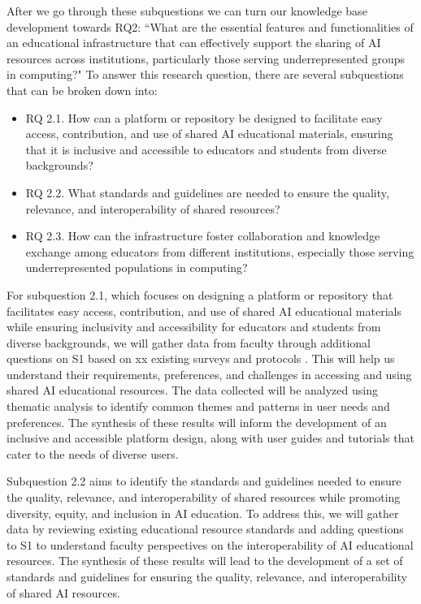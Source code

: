 \documentclass[11pt]{article}
\begin{document}
After we go through these subquestions we can turn our knowledge base development towards RQ2: ``What are the essential features and functionalities of an educational infrastructure that can effectively support the sharing of AI resources across institutions, particularly those serving underrepresented groups in computing?"  To answer this research question, there are several subquestions that can be broken down into:
\begin{itemize}

\item[]RQ 2.1. How can a platform or repository be designed to facilitate easy access, contribution, and use of shared AI educational materials, ensuring that it is inclusive and accessible to educators and students from diverse backgrounds?
\item[]RQ 2.2. What standards and guidelines are needed to ensure the quality, relevance, and interoperability of shared resources?
\item[]RQ 2.3. How can the infrastructure foster collaboration and knowledge exchange among educators from different institutions, especially those serving underrepresented populations in computing?
\end{itemize}

For subquestion 2.1, which focuses on designing a platform or repository that facilitates easy access, contribution, and use of shared AI educational materials while ensuring inclusivity and accessibility for educators and students from diverse backgrounds, we will gather data from faculty through additional questions on S1 based on xx existing surveys and protocols \cite{xxx}.
This will help us understand their requirements, preferences, and challenges in accessing and using shared AI educational resources. 
The data collected will be analyzed using thematic analysis to identify common themes and patterns in user needs and preferences.  
The synthesis of these results will inform the development of an inclusive and accessible platform design, along with user guides and tutorials that cater to the needs of diverse users. 

Subquestion 2.2 aims to identify the standards and guidelines needed to ensure the quality, relevance, and interoperability of shared resources while promoting diversity, equity, and inclusion in AI education. To address this, we will gather data by reviewing existing educational resource standards and adding questions to S1 to understand faculty perspectives on the interoperability of AI educational resources. 
The synthesis of these results will lead to the development of a set of standards and guidelines for ensuring the quality, relevance, and interoperability of shared AI resources. 
\end{document}
